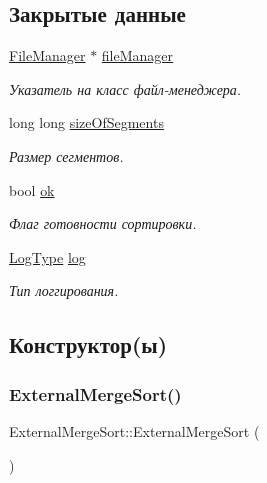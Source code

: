 \subsection*{Закрытые данные}
\begin{DoxyCompactItemize}
\item 
\hyperlink{class_file_manager}{File\+Manager} $\ast$ \hyperlink{class_external_merge_sort_ab82d3b62a57be6c80dbd12b90de278e2}{file\+Manager}
\begin{DoxyCompactList}\small\item\em Указатель на класс файл-\/менеджера. \end{DoxyCompactList}\item 
long long \hyperlink{class_external_merge_sort_a1d68bb5e0373cf16807a41272dff1a99}{size\+Of\+Segments}
\begin{DoxyCompactList}\small\item\em Размер сегментов. \end{DoxyCompactList}\item 
bool \hyperlink{class_external_merge_sort_a4b050cd230e144a11f65e57523e15ce6}{ok}
\begin{DoxyCompactList}\small\item\em Флаг готовности сортировки. \end{DoxyCompactList}\item 
\hyperlink{_structures_8h_af67907baa897e9fb84df0cb89795b87c}{Log\+Type} \hyperlink{class_external_merge_sort_a41f61c3beb7dc529d7f2a8b2b4ee380b}{log}
\begin{DoxyCompactList}\small\item\em Тип логгирования. \end{DoxyCompactList}\end{DoxyCompactItemize}


\subsection{Конструктор(ы)}
\hypertarget{class_external_merge_sort_a7b6efcd2abbf59a8983f972c52d04650}{}\label{class_external_merge_sort_a7b6efcd2abbf59a8983f972c52d04650} 
\subsubsection{\texorpdfstring{External\+Merge\+Sort()}{ExternalMergeSort()}\hspace{0.1cm}{\footnotesize\ttfamily [1/2]}}
{\footnotesize\ttfamily External\+Merge\+Sort\+::\+External\+Merge\+Sort (\begin{DoxyParamCaption}{ }\end{DoxyParamCaption})}



